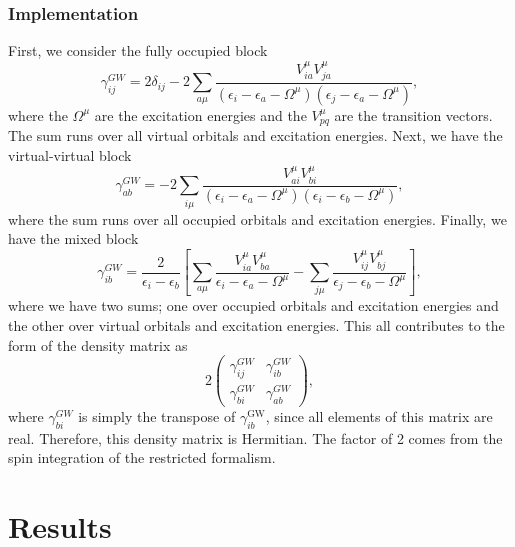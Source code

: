 \documentclass[12pt]{caltech_thesis}
\begin{document}
\subsection{Implementation}
First, we consider the fully occupied block
\begin{equation}
\gamma_{ij}^{GW}=2\delta_{ij}-2\sum_{a\mu} \frac{{V}_{ia}^\mu {V}_{ja}^\mu}{\left(\epsilon_{i}-\epsilon_{a}-{\Omega ^{\mu}}\right)\left(\epsilon_{j}-\epsilon_{a}-{\Omega ^{\mu}}\right)},
\end{equation}
where the ${\Omega ^{\mu}}$ are the excitation energies and the ${V}_{pq}^{\mu}$ are the transition vectors. The sum runs over all virtual orbitals and excitation energies. Next, we have the virtual-virtual block
\begin{equation}
\gamma_{ab}^{GW}=-2\sum_{i\mu} \frac{{V}_{ai}^{\mu} {V}_{bi}^{\mu}}{\left(\epsilon_{i}-\epsilon_{a}-{\Omega ^{\mu}}\right)\left(\epsilon_{i}-\epsilon_{b}-{\Omega ^{\mu}}\right)},
\end{equation}
where the sum runs over all occupied orbitals and excitation energies.
Finally, we have the mixed block
\begin{equation}
    \gamma_{i b}^{G W}=\frac{2}{\epsilon_{i}-\epsilon_{b}}\left[ \sum_{a \mu} \frac{{V}_{i a}^{\mu} {V}_{b a}^{\mu}}{\epsilon_{i}-\epsilon_{a}-{\Omega ^{\mu}}} - \sum_{j \mu} \frac{{V}_{i j}^{\mu} {V}_{bj}^{\mu}}{\epsilon_{j}-\epsilon_{b}-{\Omega ^{\mu}}} \right],
\end{equation}
where we have two sums; one over occupied orbitals and excitation energies and the other over virtual orbitals and excitation energies.
This all contributes to the form of the density matrix as
\begin{equation*}
    2\begin{pmatrix}
        \gamma _{i j}^{G W} & \gamma _{i b}^{G W} \\
        \gamma _{bi}^{G W } & \gamma _{a b}^{G W}
    \end{pmatrix},
\end{equation*}
where $\gamma _{bi}^{G W }$ is simply the transpose of $\gamma _{ib}^{\text{GW}}$, since all elements of this matrix are real. Therefore, this density matrix is Hermitian. The factor of 2 comes from the spin integration of the restricted formalism.



\chapter{Results}
\end{document}

